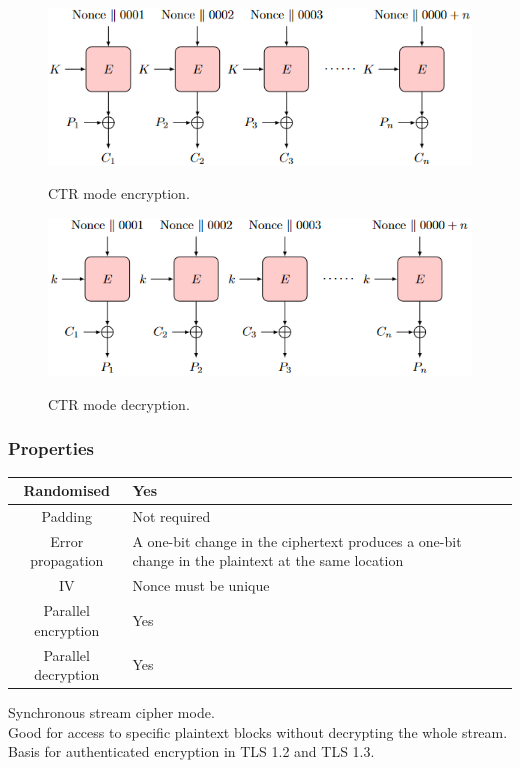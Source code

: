 \documentclass{article}
\begin{document}
\begin{figure}[H]
\centering
\includegraphics[scale=0.75]{Images/ctrencryption.png}
\label{fig:fround}
\caption{CTR mode encryption.}
\end{figure}
\begin{figure}[H]
\centering
\includegraphics[scale=0.75]{Images/ctrdecryption.png}
\label{fig:fround}
\caption{CTR mode decryption.}
\end{figure}

\subsubsection{Properties}

\begin{center}
\begin{tabular}{ | c | p{5cm} | } 
\hline
Randomised & Yes \\
\hline
Padding & Not required \\ 
\hline
Error propagation & A one-bit change in the ciphertext produces a one-bit change in the plaintext at the same location \\ 
\hline
IV & Nonce must be unique \\ 
\hline
Parallel encryption & Yes \\ 
\hline
Parallel decryption & Yes \\ 
\hline
\end{tabular}
\end{center}

Synchronous stream cipher mode.\\
Good for access to specific plaintext blocks without decrypting the whole stream.\\
Basis for authenticated encryption in TLS 1.2 and TLS 1.3.
\end{document}
